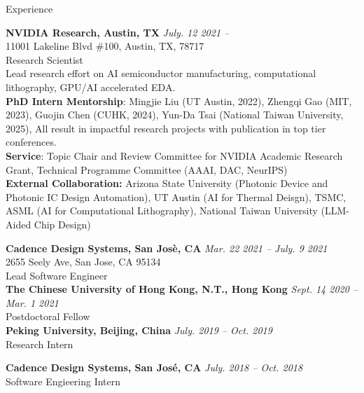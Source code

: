 
\begin{rSection}{Experience}

{\bf NVIDIA Research, Austin, TX}         \hfill {\em July. 12 2021 -- } \\
11001 Lakeline Blvd \#100, Austin, TX, 78717 \\
Research Scientist \\
Lead research effort on AI semiconductor manufacturing, computational lithography, GPU/AI accelerated EDA. \\
\textbf{PhD Intern Mentorship}: Mingjie Liu (UT Austin, 2022), Zhengqi Gao (MIT, 2023), Guojin Chen (CUHK, 2024), Yun-Da Tsai (National Taiwan University, 2025), All result in impactful research projects with publication in top tier conferences.\\
\textbf{Service}: Topic Chair and Review Committee for NVIDIA Academic Research Grant, Technical Programme Committee (AAAI, DAC, NeurIPS) \\
\textbf{External Collaboration:} Arizona State University (Photonic Device and Photonic IC Design Automation), UT Austin (AI for Thermal Deisgn), TSMC, ASML (AI for Computational Lithography), National Taiwan University (LLM-Aided Chip Design)
	
{\bf Cadence Design Systems, San Jos\`{e}, CA}         \hfill {\em Mar. 22 2021 -- July. 9 2021 } \\
2655 Seely Ave, San Jose, CA 95134 \\
Lead Software Engineer \\
	
{\bf The Chinese University of Hong Kong, N.T., Hong Kong}         \hfill {\em Sept. 14 2020 -- Mar. 1 2021} \\
Postdoctoral Fellow \\

{\bf Peking University, Beijing, China}         \hfill {\em July. 2019 -- Oct. 2019} \\
Research Intern

{\bf Cadence Design Systems, San Jos\'{e}, CA}         \hfill {\em July. 2018 -- Oct. 2018} \\
Software Engieering Intern
	

\end{rSection}
